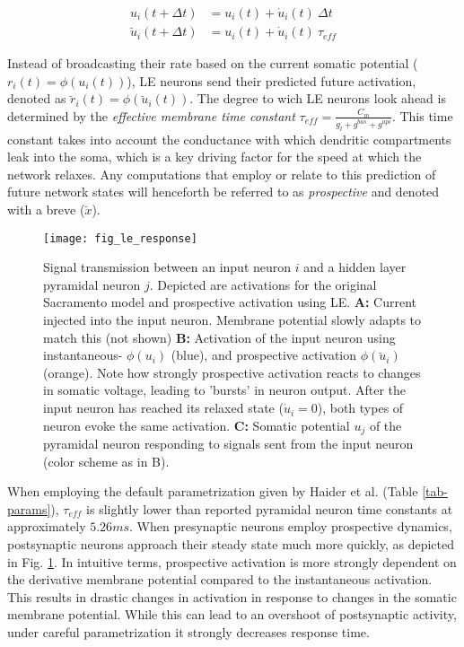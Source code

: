 \begin{align}
  u_i(t+ \Delta t)          & = u_i(t) + \dot{u}_i(t) \ \Delta t \label{eq-r-t-sacramento} \\
  \breve{u}_i(t + \Delta t) & = u_i(t) + \dot{u}_i(t) \ \tau_{eff} \label{eq-r-t-haider}
\end{align}

Instead of broadcasting their rate based on the current somatic potential ($r_i(t) = \phi(u_i(t))$), LE neurons send
their predicted future activation, denoted as $\breve{r}_i(t) = \phi(\breve{u}_i(t))$. The degree to wich LE neurons
look ahead is determined by the \textit{effective membrane time constant} $\tau_{eff} = \frac{C_m}{g_l + g^{bas} +
g^{api}}$. This time constant takes into account the conductance with which dendritic compartments leak into the soma,
which is a key driving factor for the speed at which the network relaxes. Any computations that employ or relate to this
prediction of future network states will henceforth be referred to as \textit{prospective} and denoted with a breve
($\breve{x}$).


\begin{figure}[h!]
  \centering
  \texttt{[image: fig\_le\_response]}
  \caption[Signal transmission of LE neurons]{Signal transmission between an input neuron $i$ and a hidden layer
    pyramidal neuron $j$. Depicted are activations for the original Sacramento model and prospective activation using
    LE. \textbf{A:} Current injected into the input neuron. Membrane potential slowly adapts to match this (not shown)
    \textbf{B:} Activation of the input neuron using instantaneous- $\phi(u_i)$ (blue), and prospective activation
    $\phi(\breve{u}_i)$ (orange). Note how strongly prospective activation reacts to changes in somatic voltage, leading
    to 'bursts' in neuron output. After the input neuron has reached its relaxed state ($\dot{u}_i = 0$), both types of
    neuron evoke the same activation. \textbf{C:} Somatic potential $u_j$ of the pyramidal neuron responding to signals
    sent from the input neuron (color scheme as in B).}
  \label{fig-comparison-le}
\end{figure}

When employing the default parametrization given by Haider et al. (Table \ref{tab-params}), $\tau_{eff}$ is
slightly lower than reported pyramidal neuron time constants \citep{McCormick1985} at approximately $5.26ms$. When
presynaptic neurons employ prospective dynamics, postsynaptic neurons approach their steady state much more quickly, as
depicted in Fig. \ref{fig-comparison-le}. In intuitive terms, prospective activation is more strongly dependent on the
derivative membrane potential compared to the instantaneous activation. This results in drastic changes in activation
in response to changes in the somatic membrane potential. While this can lead to an overshoot of postsynaptic activity,
under careful parametrization it strongly decreases response time.   


